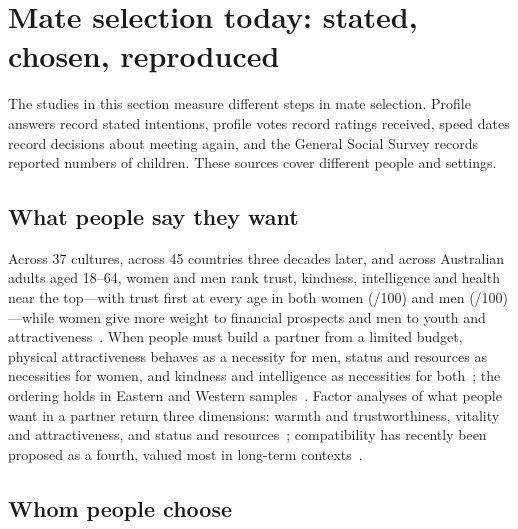 \section{Mate selection today: stated, chosen, reproduced}\label{sec:today}

\noindent The studies in this section measure different steps in mate selection. Profile answers record stated
intentions, profile votes record ratings received, speed dates record decisions about meeting again, and the General
Social Survey records reported numbers of children. These sources cover different people and settings.



\subsection{What people say they want}

Across 37 cultures, across 45 countries three decades later, and across \PboWhyteN{} Australian adults aged 18--64, women and men rank trust, kindness, intelligence and
health near the top---with trust first at every age in both women (\PboWhyteTrustW/100) and men (\PboWhyteTrustM/100)---while women give more weight to financial prospects and men to youth and attractiveness~\cite{buss1989,walter2020,whyte2021}.
When people must build a partner from a limited budget, physical attractiveness behaves as a necessity for men, status and
resources as necessities for women, and kindness and intelligence as necessities for both~\cite{li2002}; the ordering holds in
Eastern and Western samples~\cite{thomas2020}. Factor analyses of what people want in a partner return three dimensions:
warmth and trustworthiness, vitality and attractiveness, and status and resources~\cite{fletcher1999}; compatibility has
recently been proposed as a fourth, valued most in long-term contexts~\cite{jonason2026}.

\subsection{Whom people choose}

